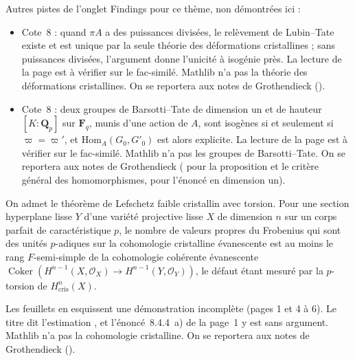 \bigskip
\noindent Autres pistes de l'onglet Findings pour ce thème, non démontrées ici :
\begin{itemize}\small\setlength{\itemsep}{0pt}
\item Cote~8 : quand $\pi A$ a des puissances divisées, le relèvement de Lubin--Tate existe et est unique par la seule théorie des déformations cristallines ; sans puissances divisées, l'argument donne l'unicité à isogénie près. La lecture de la page est à vérifier sur le fac-similé. Mathlib n'a pas la théorie des déformations cristallines. On se reportera aux notes de Grothendieck ().
\item Cote~8 : deux groupes de Barsotti--Tate de dimension un et de hauteur $[K : \mathbf Q_p]$ sur $\mathbf F_q$, munis d'une action de $A$, sont isogènes si et seulement si $\varpi = \varpi'$, et $\mathrm{Hom}_A(G_0, G'_0)$ est alors explicite. La lecture de la page est à vérifier sur le fac-similé. Mathlib n'a pas les groupes de Barsotti--Tate. On se reportera aux notes de Grothendieck ( pour la proposition et le critère général des homomorphismes,  pour l'énoncé en dimension un).
\end{itemize}

\begin{encadre}
\begin{theoreme*}\nonverifie
On admet le théorème de Lefschetz faible cristallin avec torsion. Pour une section hyperplane lisse $Y$ d'une variété projective lisse $X$ de dimension $n$ sur un corps parfait de caractéristique $p$, le nombre de valeurs propres du Frobenius qui sont des unités $p$-adiques sur la cohomologie cristalline évanescente est au moins le rang $F$-semi-simple de la cohomologie cohérente évanescente $\operatorname{Coker}(H^{n-1}(X, \mathcal O_X) \to H^{n-1}(Y, \mathcal O_Y))$, le défaut étant mesuré par la $p$-torsion de $H^n_{\mathrm{cris}}(X)$.
\end{theoreme*}
\end{encadre}
{\small Les feuillets en esquissent une démonstration incomplète (pages 1 et 4 à 6). Le titre dit l'estimation , et l'énoncé~8.4.4~a) de la page~1 y est sans argument. Mathlib n'a pas la cohomologie cristalline. On se reportera aux notes de Grothendieck ().\par}

